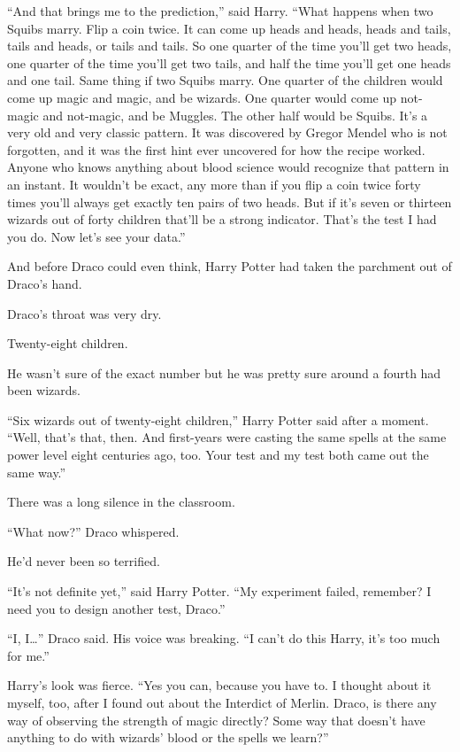 “And that brings me to the prediction,” said Harry. “What happens when two Squibs marry. Flip a coin twice. It can come up heads and heads, heads and tails, tails and heads, or tails and tails. So one quarter of the time you’ll get two heads, one quarter of the time you’ll get two tails, and half the time you’ll get one heads and one tail. Same thing if two Squibs marry. One quarter of the children would come up magic and magic, and be wizards. One quarter would come up not-magic and not-magic, and be Muggles. The other half would be Squibs. It’s a very old and very classic pattern. It was discovered by Gregor Mendel who is not forgotten, and it was the first hint ever uncovered for how the recipe worked. Anyone who knows anything about blood science would recognize that pattern in an instant. It wouldn’t be exact, any more than if you flip a coin twice forty times you’ll always get exactly ten pairs of two heads. But if it’s seven or thirteen wizards out of forty children that’ll be a strong indicator. That’s the test I had you do. Now let’s see your data.”

And before Draco could even think, Harry Potter had taken the parchment out of Draco’s hand.

Draco’s throat was very dry.

Twenty-eight children.

He wasn’t sure of the exact number but he was pretty sure around a fourth had been wizards.

“Six wizards out of twenty-eight children,” Harry Potter said after a moment. “Well, that’s that, then. And first-years were casting the same spells at the same power level eight centuries ago, too. Your test and my test both came out the same way.”

There was a long silence in the classroom.

“What now?” Draco whispered.

He’d never been so terrified.

“It’s not definite yet,” said Harry Potter. “My experiment failed, remember? I need you to design another test, Draco.”

“I, I…” Draco said. His voice was breaking. “I can’t do this Harry, it’s too much for me.”

Harry’s look was fierce. “Yes you can, because you have to. I thought about it myself, too, after I found out about the Interdict of Merlin. Draco, is there any way of observing the strength of magic directly? Some way that doesn’t have anything to do with wizards’ blood or the spells we learn?”

